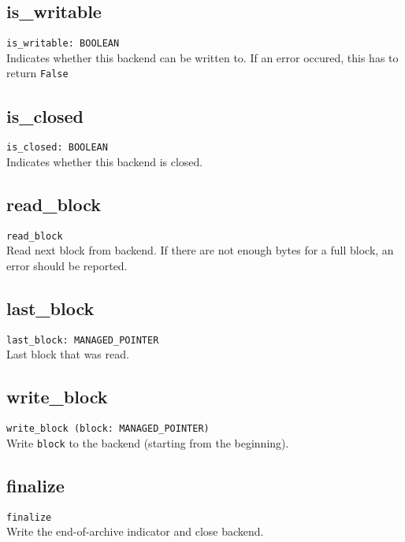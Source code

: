 \subsection{is\_writable}
\lstinline;is_writable: BOOLEAN;\\
Indicates whether this backend can be written to. If an error occured, this has
to return \lstinline;False;

\subsection{is\_closed}
\lstinline;is_closed: BOOLEAN;\\
Indicates whether this backend is closed.

\subsection{read\_block}
\lstinline;read_block;\\
Read next block from backend. If there are not enough bytes for a full block, an
error should be reported.

\subsection{last\_block}
\lstinline;last_block: MANAGED_POINTER;\\
Last block that was read.

\subsection{write\_block}
\lstinline;write_block (block: MANAGED_POINTER);\\
Write \lstinline;block; to the backend (starting from the beginning).

\subsection{finalize}
\lstinline;finalize;\\
Write the end-of-archive indicator and close backend.
